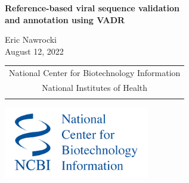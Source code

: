 \documentclass[landscape]{slides}
\begin{document}
\begin{slide}
\begin{center}
\large{\textbf{Reference-based viral sequence validation \\ and annotation using VADR}}

\normalsize

Eric Nawrocki \\

August 12, 2022 \\

\medskip

\medskip

\medskip

\medskip

\medskip

\small
\begin{tabular}{c}
National Center for Biotechnology Information\\
National Institutes of Health\\
\\
\end{tabular}

\vspace{0.1in}

\includegraphics[width=2.5in]{figs/ncbi-logo}

\end{center}
\end{slide}
\end{document}
